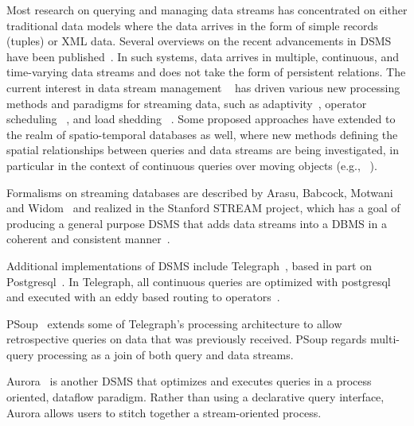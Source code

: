 \documentclass{ucdthesis}       %
\begin{document}
Most research on querying and managing data streams has concentrated
on either traditional data models where the data arrives in the form
of simple records (tuples) or XML data.  Several overviews on the
recent advancements in \acl{DSMS} have been
published~\cite{babcoc02model-issues, carney02monit-stream,
  heller00adapt-query}. In such systems, data arrives in multiple,
continuous, and time-varying data streams and does not take the form
of persistent relations.  The current interest in data stream
management ~\cite{abadi03auror,babcoc02model-issues,chand03teleg} has
driven various new processing methods and paradigms for streaming
data, such as
adaptivity~\cite{heller00adapt-query,madden02contin-adapt}, operator
scheduling ~\cite{babcock04op,carney03operat-sched}, and load shedding
~\cite{babcock04load,tatbul03load}.  Some proposed approaches have
extended to the realm of spatio-temporal databases as well, where new
methods defining the spatial relationships between queries and data
streams are being investigated, in particular in the context of
continuous queries over moving objects (e.g.,
~\cite{kalas04main-memor,mokbel04sina,prabhakar02qindex}).

Formalisms on streaming databases are described by Arasu, Babcock,
Motwani and Widom~\cite{arasu03cql-contin, babcoc02model-issues,
  motwan03query-proces} and realized in the Stanford STREAM project,
which has a goal of producing a general purpose \ac{DSMS} that adds
data streams into a \ac{DBMS} in a coherent and consistent
manner~\cite{arasu03stream}.

Additional implementations of \ac{DSMS} include
Telegraph~\cite{chand03teleg}, based in part on
Postgresql~\cite{stonebraker90implementation}.  In Telegraph, all
continuous queries are optimized with postgresql and executed with an
eddy based routing to operators~\cite{madden02contin-adapt}.

PSoup~\cite{950486} extends some of Telegraph's processing
architecture to allow retrospective queries on data that was
previously received.  PSoup regards multi-query processing as a join
of both query and data streams.

Aurora~\cite{abadi03auror} is another \ac{DSMS} that optimizes and
executes queries in a process oriented, dataflow paradigm.  Rather
than using a declarative query interface, Aurora allows users to
stitch together a stream-oriented process.
\end{document}

